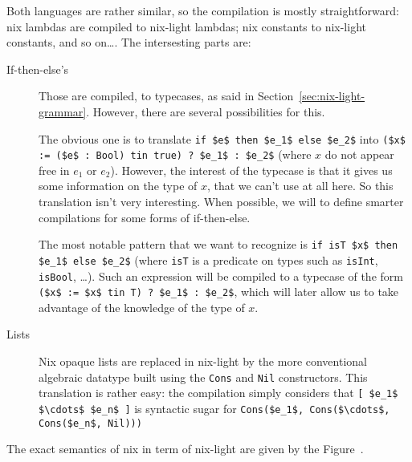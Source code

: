 Both languages are rather similar, so the compilation is mostly
straightforward: nix lambdas are compiled to nix-light lambdas; nix constants
to nix-light constants, and so on\ldots. The intersesting parts are:

\begin{description}
  \item[If-then-else's] Those are compiled, to typecases, as said in
    Section~\ref{sec:nix-light-grammar}. However, there are several
    possibilities for this.

    The obvious one is to translate \lstinline{if $e$ then $e_1$ else $e_2$} into
    \lstinline{($x$ := ($e$ : Bool) tin true) ? $e_1$ : $e_2$} (where $x$ do not appear
    free in $e_1$ or $e_2$).
    However, the interest of the typecase is that it gives us some information
    on the type of $x$, that we can't use at all here. So this translation
    isn't very interesting.
    When possible, we will  to define smarter compilations for some forms of
    if-then-else.

    The most notable pattern that we want to recognize is
    \lstinline{if isT $x$ then $e_1$ else $e_2$}
    (where \lstinline{isT} is a predicate on types such as
    \lstinline{isInt}, \lstinline{isBool}, \ldots).
    Such an expression will be compiled to a typecase of the form
    \lstinline{($x$ := $x$ tin T) ? $e_1$ : $e_2$}, which will later allow us to take
    advantage of the knowledge of the type of $x$.

  \item[Lists] Nix opaque lists are replaced in nix-light by the more
    conventional algebraic datatype built using the \lstinline{Cons} and
    \lstinline{Nil} constructors.
    This translation is rather easy: the compilation simply considers that
    \lstinline{[ $e_1$ $\cdots$ $e_n$ ]} is syntactic sugar for
    \lstinline{Cons($e_1$, Cons($\cdots$, Cons($e_n$, Nil)))} %
\end{description}

The exact semantics of nix in term of nix-light are given by the
Figure~.

